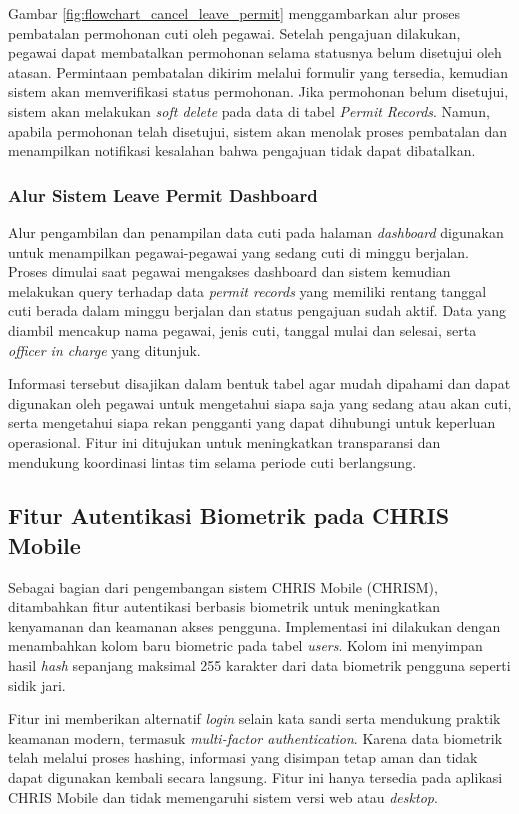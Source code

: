 Gambar \ref{fig:flowchart_cancel_leave_permit} menggambarkan alur proses pembatalan permohonan cuti oleh pegawai. Setelah pengajuan dilakukan, pegawai dapat membatalkan permohonan selama statusnya belum disetujui oleh atasan. Permintaan pembatalan dikirim melalui formulir yang tersedia, kemudian sistem akan memverifikasi status permohonan. Jika permohonan belum disetujui, sistem akan melakukan \textit{soft delete} pada data di tabel \textit{Permit Records}. Namun, apabila permohonan telah disetujui, sistem akan menolak proses pembatalan dan menampilkan notifikasi kesalahan bahwa pengajuan tidak dapat dibatalkan.

\subsubsection{Alur Sistem Leave Permit Dashboard}
Alur pengambilan dan penampilan data cuti pada halaman \textit{dashboard} digunakan untuk menampilkan pegawai-pegawai yang sedang cuti di minggu berjalan. Proses dimulai saat pegawai mengakses dashboard dan sistem kemudian melakukan query terhadap data \textit{permit records} yang memiliki rentang tanggal cuti berada dalam minggu berjalan dan status pengajuan sudah aktif. Data yang diambil mencakup nama pegawai, jenis cuti, tanggal mulai dan selesai, serta \textit{officer in charge} yang ditunjuk.

Informasi tersebut disajikan dalam bentuk tabel agar mudah dipahami dan dapat digunakan oleh pegawai untuk mengetahui siapa saja yang sedang atau akan cuti, serta mengetahui siapa rekan pengganti yang dapat dihubungi untuk keperluan operasional. Fitur ini ditujukan untuk meningkatkan transparansi dan mendukung koordinasi lintas tim selama periode cuti berlangsung.


\subsection{Fitur Autentikasi Biometrik pada CHRIS Mobile}
Sebagai bagian dari pengembangan sistem CHRIS Mobile (CHRISM), ditambahkan fitur autentikasi berbasis biometrik untuk meningkatkan kenyamanan dan keamanan akses pengguna. Implementasi ini dilakukan dengan menambahkan kolom baru biometric pada tabel \textit{users}. Kolom ini menyimpan hasil \textit{hash} sepanjang maksimal 255 karakter dari data biometrik pengguna seperti sidik jari.

Fitur ini memberikan alternatif \textit{login} selain kata sandi serta mendukung praktik keamanan modern, termasuk \textit{multi-factor authentication}. Karena data biometrik telah melalui proses hashing, informasi yang disimpan tetap aman dan tidak dapat digunakan kembali secara langsung. Fitur ini hanya tersedia pada aplikasi CHRIS Mobile dan tidak memengaruhi sistem versi web atau \textit{desktop}.

